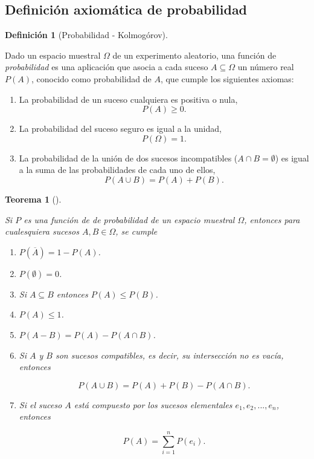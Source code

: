 \documentclass[
  spanish,
  a4paper,
]{scrreport}
\providecommand{\tightlist}{%
  \setlength{\itemsep}{0pt}\setlength{\parskip}{0pt}}
\theoremstyle{plain}
\newtheorem{theorem}{Teorema}[chapter]
\theoremstyle{definition}
\theoremstyle{definition}
\newtheorem{definition}{Definición}[chapter]
\theoremstyle{remark}
\begin{document}
\subsection{Definición axiomática de
probabilidad}\label{definiciuxf3n-axiomuxe1tica-de-probabilidad}

\begin{definition}[Probabilidad -
Kolmogórov]\protect\hypertarget{def-probabilidad-kolmogorov}{}\label{def-probabilidad-kolmogorov}

Dado un espacio muestral \(\Omega\) de un experimento aleatorio, una
función de \emph{probabilidad} es una aplicación que asocia a cada
suceso \(A\subseteq \Omega\) un número real \(P(A)\), conocido como
probabilidad de \(A\), que cumple los siguientes axiomas:

\begin{enumerate}
\def\labelenumi{\arabic{enumi}.}
\tightlist
\item
  La probabilidad de un suceso cualquiera es positiva o nula,
  \[P(A)\geq 0.\]
\item
  La probabilidad del suceso seguro es igual a la unidad,
  \[P(\Omega)=1.\]
\item
  La probabilidad de la unión de dos sucesos incompatibles
  (\(A\cap B=\emptyset\)) es igual a la suma de las probabilidades de
  cada uno de ellos, \[P(A\cup B) = P(A)+P(B).\]
\end{enumerate}

\end{definition}

\begin{theorem}[]\protect\hypertarget{thm-consecuencias-axiomas-probabilidad}{}\label{thm-consecuencias-axiomas-probabilidad}

Si \(P\) es una función de de probabilidad de un espacio muestral
\(\Omega\), entonces para cualesquiera sucesos \(A, B\in \Omega\), se
cumple

\begin{enumerate}
\def\labelenumi{\arabic{enumi}.}
\item
  \(P(\overline A) = 1-P(A)\).
\item
  \(P(\emptyset)= 0\).
\item
  Si \(A\subseteq B\) entonces \(P(A)\leq P(B)\).
\item
  \(P(A) \leq 1\).
\item
  \(P(A-B) = P(A)-P(A\cap B)\).
\item
  Si \(A\) y \(B\) son sucesos compatibles, es decir, su intersección no
  es vacía, entonces

  \[P(A\cup B)= P(A) + P(B) - P(A\cap B).\]
\item
  Si el suceso \(A\) está compuesto por los sucesos elementales
  \(e_1,e_2,...,e_n\), entonces

  \[P(A)=\sum_{i=1}^n P(e_i).\]
\end{enumerate}

\end{theorem}
\end{document}
